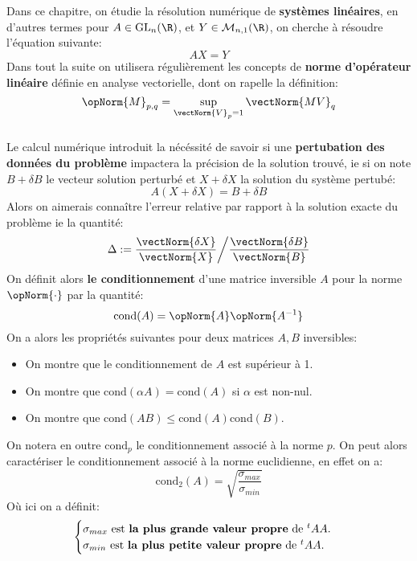 \chapter*{}

Dans ce chapitre, on étudie la résolution numérique de \textbf{systèmes linéaires}, en d'autres termes pour \(A \in \text{GL}_n(\R)\), et \(Y \in \mathcal{M}_{n, 1}(\R)\), on cherche à résoudre l'équation suivante:
\[
   AX = Y
\]
Dans tout la suite on utilisera régulièrement les concepts de \textbf{norme d'opérateur linéaire} définie en analyse vectorielle, dont on rapelle la définition:
\[
   \opNorm{M}_{p, q} = \sup_{\vectNorm{V}_p = 1} \vectNorm{MV}_q
\]
\subsection*{}
Le calcul numérique introduit la nécéssité de savoir si une \textbf{pertubation des données du problème} impactera la précision de la solution trouvé, ie si on note \(B + \delta B\) le vecteur solution perturbé et \(X + \delta X\) la solution du système pertubé:
\[
   A(X + \delta X) = B + \delta B
\]
Alors on aimerais connaître l'erreur relative par rapport à la solution exacte du problème ie la quantité:
\[
   \Delta := \frac{\vectNorm{\delta X}}{\vectNorm{X}} \bigg/ \frac{\vectNorm{\delta B}}{\vectNorm{B}}
\]
On définit alors \textbf{le conditionnement} d'une matrice inversible \(A\) pour la norme \(\opNorm{\cdot}\) par la quantité:
\[
   \text{cond}(A) = \opNorm{A}\opNorm{A^{-1}}
\]
On a alors les propriétés suivantes pour deux matrices \(A, B\) inversibles:
\begin{itemize}
   \item On montre que le conditionnement de \(A\) est supérieur à 1.
   \item On montre que \(\text{cond}(\alpha A) = \text{cond}(A)\) si \(\alpha\) est non-nul.
   \item On montre que \(\text{cond}(AB) \leq \text{cond}(A)\text{cond}(B)\).
\end{itemize}
On notera en outre \(\text{cond}_p\) le conditionnement associé à la norme \(p\). On peut alors caractériser le conditionnement associé à la norme euclidienne, en effet on a:
\[
   \text{cond}_2(A) = \sqrt{\frac{\sigma_{max}}{\sigma_{min}}}
\]
Où ici on a définit:
\[
   \begin{cases}
      \sigma_{max} \text{ est \textbf{la plus grande valeur propre} de } {}^tAA.\\
      \sigma_{min} \text{ est \textbf{la plus petite valeur propre} de } {}^tAA.
   \end{cases}
\]
